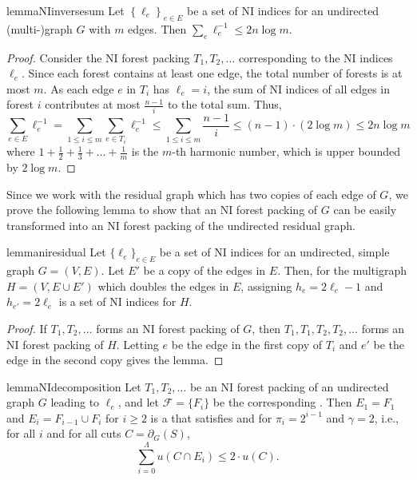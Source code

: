 \documentclass[11pt,a4paper]{article}
\begin{document}
\begin{restatable}{lemma}{NIinversesum}
\label{lem:NIinversesum}
Let $\left\{ \ell_e \right\}_{e \in E}$ be a set of NI indices for an undirected (multi-)graph $G$ with $m$ edges. Then $\sum_e \ell_e^{-1} \le 2 n \log m$.
\end{restatable}
\begin{proof}
Consider the NI forest packing $T_1, T_2, \ldots$ corresponding to the NI indices $\ell_e$. Since each forest contains at least one edge, the total number of forests is at most $m$. As each edge $e$ in $T_i$ has $\ell_e = i$, the sum of NI indices of all edges in forest $i$ contributes at most $\frac{n-1}{i}$ to the total sum. Thus,
\[
\sum_{e \in E} \ell_e^{-1}
= \sum_{1 \le i \le m} \sum_{e \in T_i} \ell_e^{-1}
\le \sum_{1 \le i \le m} \frac{n-1}{i}
\le (n-1) \cdot (2 \log m)
\le 2 n \log m
\]
where $ 1 + \frac{1}{2} + \frac{1}{3} + \dots + \frac{1}{m}$ is the $m$-th harmonic number,
which is upper bounded by $2 \log m$.
\end{proof}

Since we work with the residual graph which has two copies of each edge of $G$, we prove the following lemma to show that an NI forest packing of $G$ can be easily transformed into an NI forest packing of the undirected residual graph.

\begin{restatable}{lemma}{niresidual}
\label{lem:niresidual}
Let $\{ \ell_e \}_{e \in E}$ be a set of NI indices for an undirected, simple graph $G = (V, E)$. Let $E'$ be a copy of the edges in $E$. Then, for the multigraph $H = (V, E \cup E')$ which doubles the edges in $E$, assigning $h_e = 2 \ell_e - 1$ and $h_{e'} = 2 \ell_e$ is a set of NI indices for $H$.
\end{restatable}
\begin{proof}
If $T_1, T_2, \ldots$ forms an NI forest packing of $G$, then $T_1, T_1, T_2, T_2, \ldots$ forms an NI forest packing of $H$. Letting $e$ be the edge in the first copy of $T_i$ and $e'$ be the edge in the second copy gives the lemma.
\end{proof}

\begin{restatable}{lemma}{NIdecomposition}
\label{lem:NIdecomposition}
Let $T_1, T_2, \ldots$ be an NI forest packing of an undirected graph $G$ leading to \niindices $\ell_e$, and let $\mathcal F = \{ F_i \}$ be the corresponding \connectivityclasses. Then $E_1 = F_1$ and $E_i = F_{i-1} \cup F_i$ for $i \ge 2$ is a \decomposition that satisfies \piconnectivity and \gammaoverlap for $\pi_i = 2^{i-1}$ and $\gamma = 2$, i.e.,
 for all $i$ and for all cuts $C = \partial_{G}(S)$,
\[
\sum_{i = 0}^\Lambda u(C \cap E_i) \le 2 \cdot u(C).
\]
\end{restatable}
\end{document}
